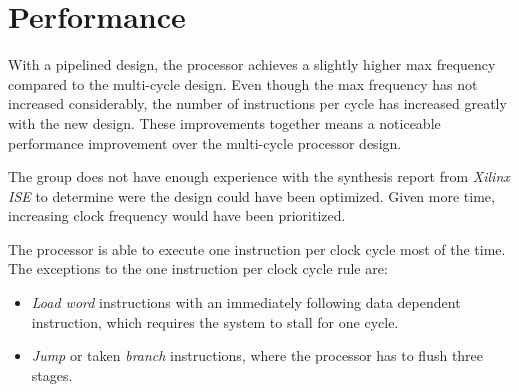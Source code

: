 \section{Performance}
With a pipelined design,
the processor achieves a slightly higher max frequency compared to the multi-cycle design.
Even though the max frequency has not increased considerably,
the number of instructions per cycle has increased greatly with the new design.
These improvements together means a noticeable performance improvement over the multi-cycle processor design.

The group does not have enough experience with the synthesis report from \textit{Xilinx ISE} to determine were the design could have been optimized.
Given more time, increasing clock frequency would have been prioritized.

The processor is able to execute one instruction per clock cycle most of the time.
The exceptions to the one instruction per clock cycle rule are:
\begin{itemize}
    \item \textit{Load word} instructions with an immediately following data dependent instruction,
        which requires the system to stall for one cycle.
    \item \textit{Jump} or taken \textit{branch} instructions,
        where the processor has to flush three stages.
\end{itemize}
